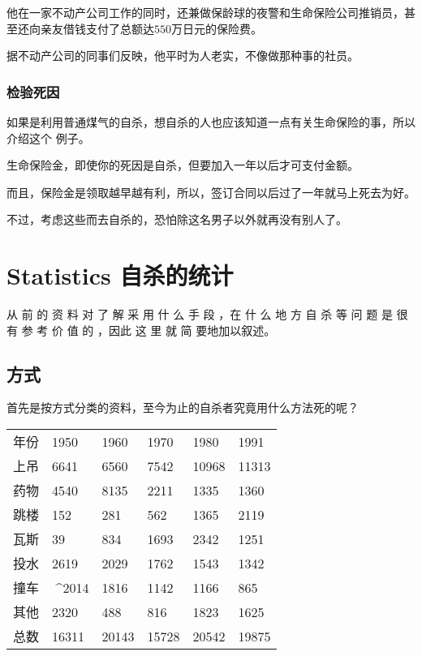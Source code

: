 \documentclass[UTF8]{ctexart}
\begin{document}
他在一家不动产公司工作的同时，还兼做保龄球的夜警和生命保险公司推销员，甚至还向亲友借钱支付了总额达$550$万日元的保险费。

据不动产公司的同事们反映，他平时为人老实，不像做那种事的社员。

\subsubsection*{检验死因}

如果是利用普通煤气的自杀，想自杀的人也应该知道一点有关生命保险的事，所以介绍这个
例子。

生命保险金，即使你的死因是自杀，但要加入一年以后才可支付金额。

而且，保险金是领取越早越有利，所以，签订合同以后过了一年就马上死去为好。

不过，考虑这些而去自杀的，恐怕除这名男子以外就再没有别人了。


\newpage

\section{Statistics 自杀的统计}

从 前 的 资 料 对 了 解 采 用 什 么 手 段 ，在 什 么 地 方 自 杀 等 问 题 是 很 有 参 考 价 值 的 ，因此 这 里 就 简 要地加以叙述。

\subsection{方式}

首先是按方式分类的资料，至今为止的自杀者究竟用什么方法死的呢？

\begin{table}[]
\center
\begin{tabular}{llllll}
年份 & 1950  & 1960  & 1970  & 1980  & 1991  \\
上吊 & 6641  & 6560  & 7542  & 10968 & 11313 \\
药物 & 4540  & 8135  & 2211  & 1335  & 1360  \\
跳楼 & 152   & 281   & 562   & 1365  & 2119  \\
瓦斯 & 39    & 834   & 1693  & 2342  & 1251  \\
投水 & 2619  & 2029  & 1762  & 1543  & 1342  \\
撞车 & ^^^^2014     & 1816  & 1142  & 1166  & 865   \\
其他 & 2320  & 488   & 816   & 1823  & 1625  \\
总数 & 16311 & 20143 & 15728 & 20542 & 19875
\end{tabular}
\end{table}
\end{document}
